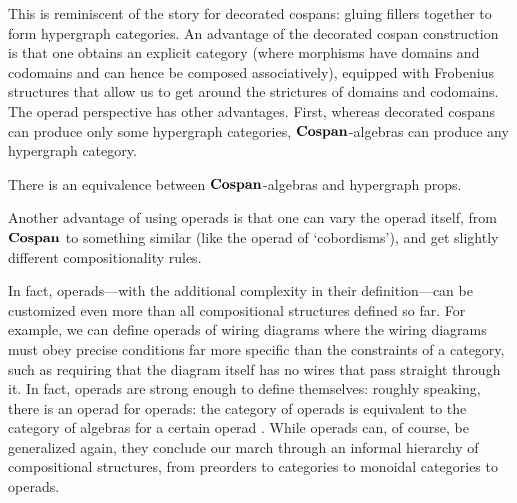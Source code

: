 \documentclass[7Sketches]{subfiles}
\begin{document}
This is reminiscent of the story for decorated cospans: gluing fillers together to form hypergraph categories. An advantage of the decorated cospan construction is that one obtains an explicit category (where morphisms have domains and codomains and can hence be composed associatively), equipped with Frobenius structures that allow us to get around the strictures of domains and codomains. The operad perspective has other advantages. First, whereas decorated cospans can produce only some hypergraph categories, $\mathbf{Cospan}$-algebras can produce any hypergraph category.

\begin{proposition}%
%
There is an equivalence between $\mathbf{Cospan}$-algebras and hypergraph props.
\end{proposition}


Another advantage of using operads is that one can vary the operad itself, from $\mathbf{Cospan}$ to something similar (like the operad of `cobordisms'), and get slightly different compositionality rules. 

In fact, operads---with the additional complexity in their definition---can be customized
even more than all compositional structures defined so far. For example, we can
define operads of wiring diagrams where the wiring diagrams must obey precise
conditions far more specific than the constraints of a category, such as
requiring that the diagram itself has no wires that pass straight through it.
In fact, operads are strong enough to define themselves: roughly speaking, there is an operad for operads: the category of operads is equivalent to the category of algebras for a certain operad \cite[Example 2.2.23]{Leinster:2004a}.
While operads can, of course, be generalized again, they conclude our
march through an informal hierarchy of compositional structures, from preorders to
categories to monoidal categories to operads.%
%
\end{document}
